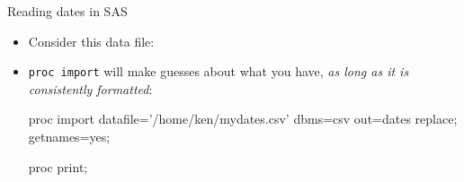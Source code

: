 \documentclass[unknownkeysallowed]{beamer}\usepackage[]{graphicx}\usepackage[]{color}
\begin{document}

\begin{frame}[fragile]{Reading dates in SAS}
  
  \begin{itemize}
    \item Consider this data file:
      
      
    
  \item \texttt{proc import} will make guesses about what you have,
    \emph{as long as it is consistently formatted}:
    
  \begin{Datastep}
proc import
  datafile='/home/ken/mydates.csv'
    dbms=csv
    out=dates
    replace;
  getnames=yes;
  \end{Datastep}

  \begin{Sascode}[store=da]
proc print;
  \end{Sascode}
    
  \end{itemize}
  
\end{frame}
\end{document}
